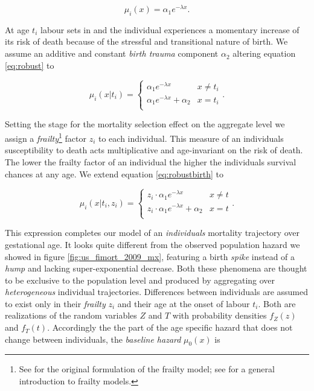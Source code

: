 \documentclass[12pt, parskip=half]{scrartcl}
\begin{document}
\begin{equation}
  \mu_i(x) = \alpha_1 e^{-\lambda x}.
  \label{eq:robust}
\end{equation}

At age $t_i$ labour sets in and the individual experiences a momentary increase of its risk of death because of the stressful and transitional nature of birth. We assume an additive and constant \emph{birth trauma} component $\alpha_2$ altering equation \ref{eq:robust} to

\begin{equation}
  \mu_i(x|t_i) =
  \begin{cases}
    \alpha_1 e^{-\lambda x} & x \neq t_i \\
    \alpha_1 e^{-\lambda x} + \alpha_2 & x = t_i \\
  \end{cases}.
  \label{eq:robustbirth}
\end{equation}

Setting the stage for the mortality selection effect on the aggregate level we assign a \emph{frailty}\footnote{See \cite{Vaupel1979} for the original formulation of the frailty model; see \cite{Wienke2011} for a general introduction to frailty models.} factor $z_i$ to each individual. This measure of an individuals susceptibility to death acts multiplicative and age-invariant on the risk of death. The lower the frailty factor of an individual the higher the individuals survival chances at any age. We extend equation \ref{eq:robustbirth} to

\begin{equation}
  \mu_i(x|t_i,z_i) =
  \begin{cases}
    z_i \cdot \alpha_1 e^{-\lambda x} & x \neq t \\
    z_i \cdot \alpha_1 e^{-\lambda x} + \alpha_2 & x = t \\
  \end{cases}.
  \label{eq:indhzrd}
\end{equation}

This expression completes our model of an \emph{individuals} mortality trajectory over gestational age. It looks quite different from the observed population hazard we showed in figure \ref{fig:us_fimort_2009_mx}, featuring a birth \emph{spike} instead of a \emph{hump} and lacking super-exponential decrease. Both these phenomena are thought to be exclusive to the population level and produced by aggregating over \emph{heterogeneous} individual trajectories. Differences between individuals are assumed to exist only in their \emph{frailty} $z_i$ and their age at the onset of labour $t_i$. Both are realizations of the random variables $Z$ and $T$ with probability densities $f_Z(z)$ and $f_T(t)$. Accordingly the the part of the age specific hazard that does not change between individuals, the \emph{baseline hazard} $\mu_0(x)$ is
\end{document}
